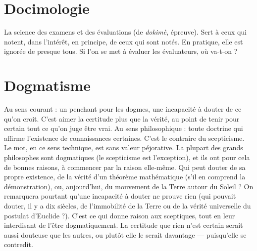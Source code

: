 \section{Docimologie}
La science des examens et des évaluations (de {\it dokimè},
épreuve). Sert à ceux qui notent, dans l'intérêt, en principe,
de ceux qui sont notés. En pratique, elle est ignorée de presque tous. Si
l’on se met à évaluer les évaluateurs, où va-t-on ?

\section{Dogmatisme}
Au sens courant : un penchant pour les dogmes, une incapacité
à douter de ce qu’on croit. C’est aimer la certitude
plus que la vérité, au point de tenir pour certain tout ce qu’on juge être vrai.
Au sens philosophique : toute doctrine qui affirme l'existence de connaissances
certaines. C’est le contraire du scepticisme. Le mot, en ce sens technique,
est sans valeur péjorative. La plupart des grands philosophes sont dogmatiques
(le scepticisme est l’exception), et ils ont pour cela de bonnes raisons,
à commencer par la raison elle-même. Qui peut douter de sa propre existence,
de la vérité d’un théorème mathématique (s’il en comprend la démonstration),
ou, aujourd’hui, du mouvement de la Terre autour du Soleil ? On remarquera
pourtant qu’une incapacité à douter ne prouve rien (qui pouvait douter, il y a
dix siècles, de l’immobilité de la Terre ou de la vérité universelle du postulat
d’Euclide ?). C’est ce qui donne raison aux sceptiques, tout en leur interdisant
de l’être dogmatiquement. La certitude que rien n’est certain serait aussi douteuse
que les autres, ou plutôt elle le serait davantage — puisqu'elle se contredit.

